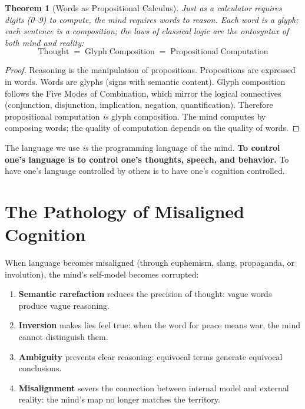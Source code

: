 \documentclass[12pt, letterpaper]{book}
\def\equiv{=}%
\newtheorem{theorem}{Theorem}[chapter]
\begin{document}
\begin{theorem}[Words as Propositional Calculus]\label{thm:words-propcalc}
Just as a calculator requires digits (0--9) to compute, the mind requires words to reason. Each word is a glyph; each sentence is a composition; the laws of classical logic are the ontosyntax of both mind and reality:
\[
\mathrm{Thought} \;\equiv\; \mathrm{Glyph\; Composition} \;\equiv\; \mathrm{Propositional\; Computation}
\]
\end{theorem}

\begin{proof}
Reasoning is the manipulation of propositions. Propositions are expressed in words. Words are glyphs (signs with semantic content). Glyph composition follows the Five Modes of Combination, which mirror the logical connectives (conjunction, disjunction, implication, negation, quantification). Therefore propositional computation \textit{is} glyph composition. The mind computes by composing words; the quality of computation depends on the quality of words.
\end{proof}

The language we use \textit{is} the programming language of the mind. \textbf{To control one's language is to control one's thoughts, speech, and behavior.} To have one's language controlled by others is to have one's cognition controlled.

\section{The Pathology of Misaligned Cognition}

When language becomes misaligned (through euphemism, slang, propaganda, or involution), the mind's self-model becomes corrupted:

\begin{enumerate}[label=(\roman*)]
    \item \textbf{Semantic rarefaction} reduces the precision of thought: vague words produce vague reasoning.
    \item \textbf{Inversion} makes lies feel true: when the word for peace means war, the mind cannot distinguish them.
    \item \textbf{Ambiguity} prevents clear reasoning: equivocal terms generate equivocal conclusions.
    \item \textbf{Misalignment} severs the connection between internal model and external reality: the mind's map no longer matches the territory.
\end{enumerate}
\end{document}
